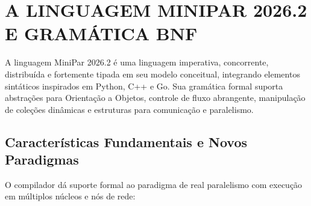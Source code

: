 \chapter{A LINGUAGEM MINIPAR 2026.2 E GRAMÁTICA BNF}

A linguagem MiniPar 2026.2 é uma linguagem imperativa, concorrente, distribuída e fortemente tipada em seu modelo conceitual, integrando elementos sintáticos inspirados em Python, C++ e Go. Sua gramática formal suporta abstrações para Orientação a Objetos, controle de fluxo abrangente, manipulação de coleções dinâmicas e estruturas para comunicação e paralelismo.

\section{Características Fundamentais e Novos Paradigmas}

O compilador dá suporte formal ao paradigma de real paralelismo com execução em múltiplos núcleos e nós de rede:

